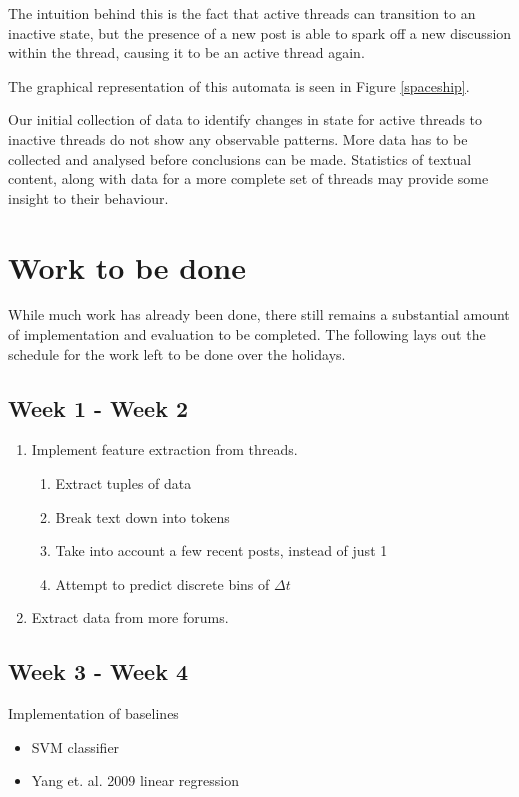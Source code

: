 \documentclass[12 pt]{article}
\begin{document}
The intuition behind this is the fact that active threads can transition to an inactive state, but the presence of a new post is able to spark off a new discussion within the thread, causing it to be an active thread again.

The graphical representation of this automata is seen in Figure \ref{spaceship}.


Our initial collection of data to identify changes in state for active threads to inactive threads do not show any observable patterns. More data has to be collected and analysed before conclusions can be made. Statistics of textual content, along with data for a more complete set of threads may provide some insight to their behaviour.

\section{Work to be done}
While much work has already been done, there still remains a substantial amount of implementation and evaluation to be completed. The following lays out the schedule for the work left to be done over the holidays.

\subsection{Week 1 - Week 2}
	\begin{enumerate}
		\item Implement feature extraction from threads.
		\begin{enumerate}
			\item Extract tuples of data
			\item Break text down into tokens
			\item Take into account a few recent posts, instead of just 1
			\item Attempt to predict discrete bins of $\Delta t$
		\end{enumerate}
		\item Extract data from more forums.
	\end{enumerate}

\subsection{Week 3 - Week 4}
	Implementation of baselines
	\begin{itemize}
		\item SVM classifier
		\item Yang et. al. 2009 linear regression
	\end{itemize}
\end{document}
